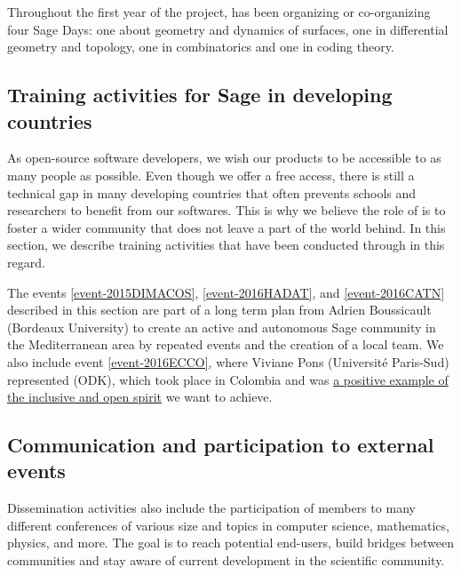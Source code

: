 \documentclass{deliverablereport}
\begin{document}
Throughout the first year of the project, \ODK has been organizing or co-organizing
four Sage Days: one about geometry and dynamics of surfaces, one in differential geometry and topology,
 one in combinatorics and one in coding theory.






\newpage

\newpage
\subsection{Training activities for Sage in developing countries}

As open-source software developers, we wish our products
to be accessible to as many people as possible. Even though we offer
 a free access, there is still a technical gap in many 
developing countries that 
often prevents schools and researchers to benefit from our softwares.
This is why we believe the role of \ODK is to foster 
a wider community that does not leave a part of the world behind. In 
this section, we describe training activities that have been conducted 
through \ODK in this regard.



The events \ref{event-2015DIMACOS}, \ref{event-2016HADAT}, and
\ref{event-2016CATN} described in this section are part of a long term
plan from Adrien Boussicault (Bordeaux University) to create an active
and autonomous Sage community in the Mediterranean area by repeated
events and the creation of a local team. We also include event
\ref{event-2016ECCO}, where Viviane Pons (Université Paris-Sud)
represented \ODK (ODK), which took place in Colombia and was
\href{http://blogs.ams.org/matheducation/2016/08/22/an-inclusive-maths-conference-ecco-2016/}
{a positive example of the inclusive and open spirit} we want to
achieve.








\newpage

\subsection{Communication and participation to external events}

Dissemination activities also include the participation of \ODK
members to many different conferences of various size and topics
in computer science, mathematics, physics, and more. The goal is
to reach potential end-users, build bridges between communities and stay aware 
of current development in the scientific community.
\end{document}
